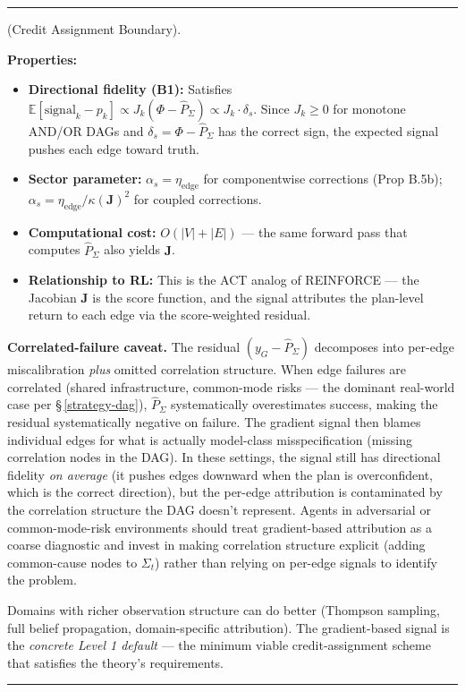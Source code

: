 \documentclass[11pt,oneside]{article}
\newcounter{claim}[section]
\renewcommand{\theclaim}{\thesection.\arabic{claim}}
\newenvironment{segment}[2]{%
  \refstepcounter{claim}%
  \bigskip\noindent\hrule\smallskip
  \noindent{\bfseries #1~\theclaim}\enskip(#2).\par\smallskip
  \noindent\ignorespaces
}{%
  \par\smallskip\noindent\hrule\bigskip
}
\newenvironment{discussion}[1][]{\begin{segment}{Discussion}{#1}}{\end{segment}}
\begin{document}
\begin{discussion}[Credit Assignment Boundary]
\textbf{Properties:}
\begin{itemize}
  \item \textbf{Directional fidelity (B1):} Satisfies $\mathbb{E}[\text{signal}_k - p_k] \propto J_k(\Phi - \hat P_\Sigma) \propto J_k \cdot \delta_s$. Since $J_k \geq 0$ for monotone AND/OR DAGs and $\delta_s = \Phi - \hat P_\Sigma$ has the correct sign, the expected signal pushes each edge toward truth.
  \item \textbf{Sector parameter:} $\alpha_s = \eta_{\text{edge}}$ for componentwise corrections (Prop B.5b); $\alpha_s = \eta_{\text{edge}} / \kappa(\mathbf{J})^2$ for coupled corrections.
  \item \textbf{Computational cost:} $O(\lvert V\rvert + \lvert E\rvert)$ — the same forward pass that computes $\hat P_\Sigma$ also yields $\mathbf{J}$.
  \item \textbf{Relationship to RL:} This is the ACT analog of REINFORCE — the Jacobian $\mathbf{J}$ is the score function, and the signal attributes the plan-level return to each edge via the score-weighted residual.
\end{itemize}


\textbf{Correlated-failure caveat.} The residual $(y_G - \hat P_\Sigma)$ decomposes into per-edge miscalibration \textit{plus} omitted correlation structure. When edge failures are correlated (shared infrastructure, common-mode risks — the dominant real-world case per \S\,\ref{strategy-dag}), $\hat P_\Sigma$ systematically overestimates success, making the residual systematically negative on failure. The gradient signal then blames individual edges for what is actually model-class misspecification (missing correlation nodes in the DAG). In these settings, the signal still has directional fidelity \textit{on average} (it pushes edges downward when the plan is overconfident, which is the correct direction), but the per-edge attribution is contaminated by the correlation structure the DAG doesn't represent. Agents in adversarial or common-mode-risk environments should treat gradient-based attribution as a coarse diagnostic and invest in making correlation structure explicit (adding common-cause nodes to $\Sigma_t$) rather than relying on per-edge signals to identify the problem.

Domains with richer observation structure can do better (Thompson sampling, full belief propagation, domain-specific attribution). The gradient-based signal is the \textit{concrete Level 1 default} — the minimum viable credit-assignment scheme that satisfies the theory's requirements.



\end{discussion}
\end{document}
